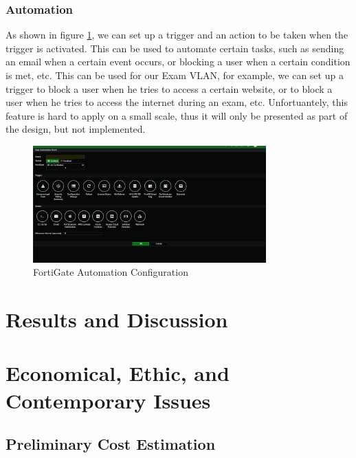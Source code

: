 \documentclass[12pt]{report}
\begin{document}
\subsection{Automation}
As shown in figure \ref{fig:auto}, we can set up a trigger and an action to be taken when the trigger is activated. This can be used to automate certain tasks, such as sending an email when a certain event occurs, or blocking a user when a certain condition is met, etc. This can be used for our Exam VLAN, for example, we can set up a trigger to block a user when he tries to access a certain website, or to block a user when he tries to access the internet during an exam, etc. Unfortuantely, this feature is hard to apply on a small scale, thus it will only be presented as part of the design, but not implemented.
\begin{figure}
    \centering
    \includegraphics[width=0.8\textwidth]{images/Implementation/auto.png}
    \caption{FortiGate Automation Configuration}
    \label{fig:auto}
\end{figure}


\chapter{Results and Discussion}

\chapter{Economical, Ethic, and Contemporary Issues}

\section{Preliminary Cost Estimation}
\end{document}
